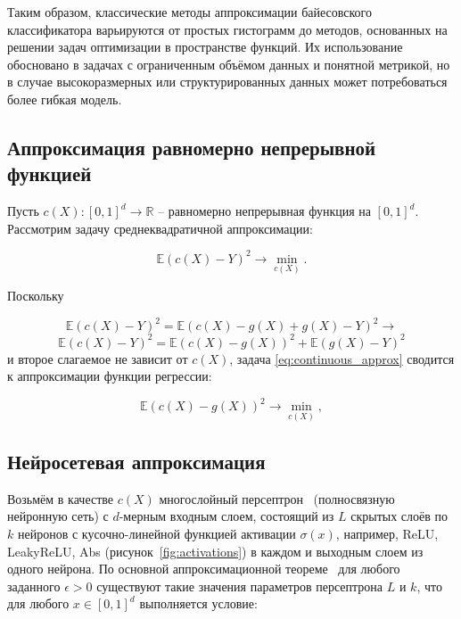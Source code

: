 Таким образом, классические методы аппроксимации байесовского классификатора варьируются от простых гистограмм до методов, основанных на решении задач оптимизации в пространстве функций. Их использование обосновано в задачах с ограниченным объёмом данных и понятной метрикой, но в случае высокоразмерных или структурированных данных может потребоваться более гибкая модель.

\subsection{Аппроксимация равномерно непрерывной функцией}\label{subsec:ch1/continuous_function_approximation}

Пусть \(c(X): [0, 1]^d \rightarrow \mathbb{R}\) -- равномерно непрерывная функция на \([0, 1]^d\). Рассмотрим задачу среднеквадратичной аппроксимации:

\begin{equation}
    \label{eq:continuous_approx}
    \mathbb{E}\left(c(X) - Y\right)^2 \rightarrow \min\limits_{c(X)}.
\end{equation}

Поскольку

\[\mathbb{E}\left(c(X) - Y\right)^2 = \mathbb{E}\left(c(X) - g(X) + g(X) - Y\right)^2 \rightarrow\]
\[\mathbb{E}\left(c(X) - Y\right)^2 = \mathbb{E}\left(c(X) - g(X)\right)^2 + \mathbb{E}\left(g(X) - Y\right)^2\]
и второе слагаемое не зависит от \(c(X)\), задача \cref{eq:continuous_approx} сводится к аппроксимации функции регрессии:

\begin{equation}
    \label{eq:regression_approx}
    \mathbb{E}\left(c(X) - g(X)\right)^2 \rightarrow \min\limits_{c(X)},
\end{equation}

\subsection{Нейросетевая аппроксимация}\label{subsec:ch1/neural_approximation}

Возьмём в качестве \(c(X)\) многослойный персептрон~\cite{murtagh1991multilayer} (полносвязную нейронную сеть) с \(d\)-мерным входным слоем, состоящий из \(L\) скрытых слоёв по \(k\) нейронов с кусочно-линейной функцией активации \(\sigma (x)\), например, ReLU, LeakyReLU, Abs (рисунок~\cref{fig:activations}) в каждом и выходным слоем из одного нейрона. По основной аппроксимационной теореме~\cite{cybenko1989approximation} для любого заданного \(\epsilon > 0\) существуют такие значения параметров персептрона \(L\) и \(k\), что для любого \(x \in [0, 1]^d\) выполняется условие:

